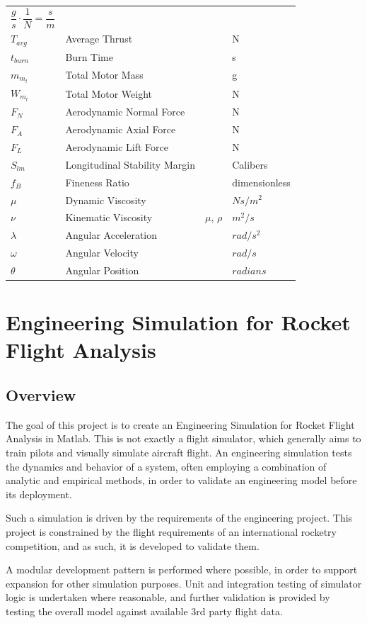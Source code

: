 \documentclass[]{article}
\begin{document}
\begin{longtable}[c]{@{}llll@{}}
\(\dfrac{g}{s}\cdot \dfrac{1}{N} = \dfrac{s}{m}\)\tabularnewline
\(T_{avg}\) & Average Thrust & & N\tabularnewline
\(t_{burn}\) & Burn Time & & s\tabularnewline
\(m_{m_t}\) & Total Motor Mass & & g\tabularnewline
\(W_{m_t}\) & Total Motor Weight & & N\tabularnewline
\(F_N\) & Aerodynamic Normal Force & & N\tabularnewline
\(F_A\) & Aerodynamic Axial Force & & N\tabularnewline
\(F_L\) & Aerodynamic Lift Force & & N\tabularnewline
\(S_{lm}\) & Longitudinal Stability Margin & & Calibers\tabularnewline
\(f_B\) & Fineness Ratio & & dimensionless\tabularnewline
\(\mu\) & Dynamic Viscosity & & \(N s / m^2\)\tabularnewline
\(\nu\) & Kinematic Viscosity & \(\mu\), \(\rho\) &
\(m^2/s\)\tabularnewline
\(\lambda\) & Angular Acceleration & & \(rad/s^2\)\tabularnewline
\(\omega\) & Angular Velocity & & \(rad/s\)\tabularnewline
\(\theta\) & Angular Position & & \(radians\)\tabularnewline
\bottomrule
\end{longtable}


\clearpage

\section{Engineering Simulation for Rocket Flight
Analysis}\label{engineering-simulation-for-rocket-flight-analysis}

\subsection{Overview}\label{overview}

The goal of this project is to create an Engineering Simulation for
Rocket Flight Analysis in Matlab. This is not exactly a flight
simulator, which generally aims to train pilots and visually simulate
aircraft flight. An engineering simulation tests the dynamics and
behavior of a system, often employing a combination of analytic and
empirical methods, in order to validate an engineering model before its
deployment.

Such a simulation is driven by the requirements of the engineering
project. This project is constrained by the flight requirements of an
international rocketry competition, and as such, it is developed to
validate them.

A modular development pattern is performed where possible, in order to
support expansion for other simulation purposes. Unit and integration
testing of simulator logic is undertaken where reasonable, and further
validation is provided by testing the overall model against available
3rd party flight data.
\end{document}
